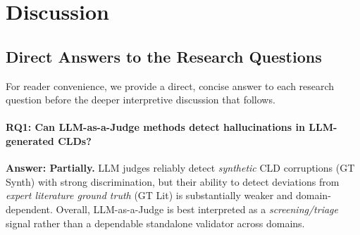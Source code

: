 \chapter{Discussion}
\label{sec:discussion}



\section{Direct Answers to the Research Questions}
\label{sec:discussion_rq_answers}
For reader convenience, we provide a direct, concise answer to each research question before the deeper interpretive discussion that follows.

\subsubsection*{RQ1: Can LLM-as-a-Judge methods detect hallucinations in LLM-generated CLDs?}
\textbf{Answer: Partially.} LLM judges reliably detect \textit{synthetic} CLD corruptions (GT Synth) with strong discrimination, but their ability to detect deviations from \textit{expert literature ground truth} (GT Lit) is substantially weaker and domain-dependent. Overall, LLM-as-a-Judge is best interpreted as a \textit{screening/triage} signal rather than a dependable standalone validator across domains.

